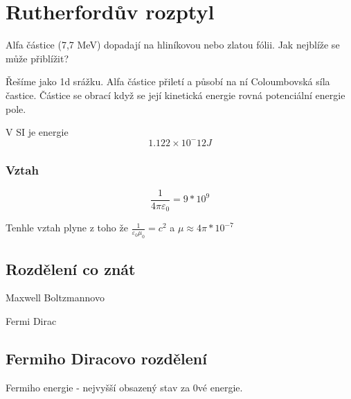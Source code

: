 \documentclass[../main.tex]{subfiles}
\begin{document}
\section{Rutherfordův rozptyl}


Alfa částice (7,7 MeV) dopadají na hliníkovou nebo zlatou fólii. Jak nejblíže se může přiblížit?


Řešíme jako 1d srážku. Alfa částice přiletí a působí na ní Coloumbovská síla častice. Částice se obrací když se 
její kinetická energie rovná potenciální energie pole. 

V SI je energie 
\begin{equation}
    1.122×10^-12 J
\end{equation}





\subsubsection{Vztah}

\begin{equation}
    \frac{1}{4\pi \varepsilon_0} = 9*10^9
\end{equation}

Tenhle vztah plyne z toho že $\frac{1}{\varepsilon_0 \mu_0} = c^2$ a $\mu \approx 4\pi * 10^{-7}$


\subsection{Rozdělení co znát}

Maxwell Boltzmannovo


Fermi Dirac 

\subsection{Fermiho Diracovo rozdělení}

Fermiho energie - nejvyšší obsazený stav za 0vé energie. 
\end{document}
